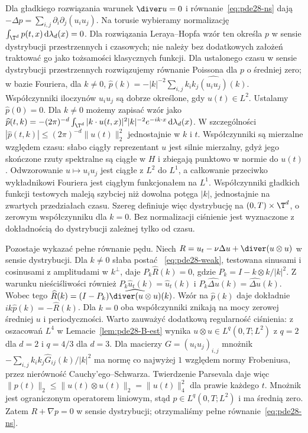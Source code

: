 \begin{uwaga}
Dla gładkiego rozwiązania warunek $\diver u=0$
i równanie~\eqref{eq:pde28-ns} dają
$-\Delta p=\sum_{i,j}\partial_i\partial_j(u_i u_j)$.
Na torusie wybieramy normalizację
$\int_{\T^d}p(t,x)\,\mathrm d\lambda_d(x)=0$.
Dla rozwiązania Leraya--Hopfa wzór ten określa $p$
w sensie dystrybucji przestrzennych i czasowych;
nie należy bez dodatkowych założeń traktować go
jako tożsamości klasycznych funkcji. Dla ustalonego czasu w sensie dystrybucji
przestrzennych rozwiązujemy równanie Poissona dla
$p$ o średniej zero; w bazie Fouriera, dla $k\ne0$,
$\widehat p(k)=-|k|^{-2}\sum_{i,j}k_i k_j
\widehat{(u_i u_j)}(k)$.
Współczynniki iloczynów $u_i u_j$ są dobrze określone,
gdy $u(t)\in L^2$. Ustalamy $\widehat p(0)=0$.
Dla $k\ne0$ możemy zapisać wzór jako
$\widehat p(t,k)=-(2\pi)^{-d}\int_{\T^d}
 |k\cdot u(t,x)|^2|k|^{-2} e^{-ik\cdot x}
 \,\mathrm d\lambda_d(x)$.
W szczególności $|\widehat p(t,k)|\le
(2\pi)^{-d}\|u(t)\|_2^2$ jednostajnie w $k$ i $t$.
Współczynniki są mierzalne względem czasu:
słabo ciągły reprezentant $u$ jest silnie
mierzalny, gdyż jego skończone rzuty spektralne
są ciągłe w $H$ i zbiegają punktowo w normie
do $u(t)$. Odwzorowanie $u\mapsto u_i u_j$
jest ciągłe z $L^2$ do $L^1$, a całkowanie
przeciwko wykładnikowi Fouriera jest ciągłym
funkcjonałem na $L^1$.
Współczynniki gładkich funkcji testowych
maleją szybciej niż dowolna potęga $|k|$,
jednostajnie na zwartych przedziałach czasu.
Szereg definiuje więc dystrybucję na
$(0,T)\times\T^d$, o zerowym współczynniku dla $k=0$.
Bez normalizacji ciśnienie jest wyznaczone
z dokładnością do dystrybucji zależnej tylko od czasu.

Pozostaje wykazać pełne równanie pędu.
Niech $R=u_t-\nu\Delta u+\diver(u\otimes u)$
w sensie dystrybucji. Dla $k\ne0$ słaba postać
~\eqref{eq:pde28-weak}, testowana sinusami i cosinusami
z amplitudami w $k^\perp$, daje $P_k\widehat R(k)=0$,
gdzie $P_k=I-k\otimes k/|k|^2$.
Z warunku nieściśliwości również
$P_k\widehat u_t(k)=\widehat u_t(k)$ i
$P_k\widehat{\Delta u}(k)=\widehat{\Delta u}(k)$.
Wobec tego
$\widehat R(k)=(I-P_k)\widehat{\diver(u\otimes u)}(k)$.
Wzór na $\widehat p(k)$ daje dokładnie
$ik\widehat p(k)=-\widehat R(k)$.
Dla $k=0$ oba współczynniki znikają na mocy
zerowej średniej $u$ i periodyczności.
Warto zauważyć dodatkową regularność ciśnienia:
z oszacowań $L^4$ w Lemacie~\ref{lem:pde28-B-est}
wynika $u\otimes u\in L^q(0,T;L^2)$
z $q=2$ dla $d=2$ i $q=4/3$ dla $d=3$.
Dla macierzy $G=(u_i u_j)_{i,j}$ mnożnik
$-\sum_{i,j}k_i k_j\widehat G_{ij}(k)/|k|^2$
ma normę co najwyżej $1$ względem normy
Frobeniusa, przez nierówność Cauchy'ego--Schwarza.
Twierdzenie Parsevala daje więc
$\|p(t)\|_2\le\|u(t)\otimes u(t)\|_2=\|u(t)\|_4^2$
dla prawie każdego $t$.
Mnożnik jest ograniczonym operatorem liniowym,
stąd $p\in L^q(0,T;L^2)$ i ma średnią zero.
Zatem $R+\nabla p=0$ w sensie dystrybucji;
otrzymaliśmy pełne równanie~\eqref{eq:pde28-ns}.
\end{uwaga}


